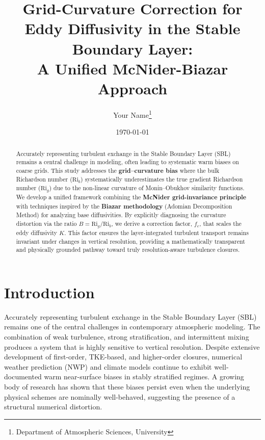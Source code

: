 \documentclass[12pt, a4paper]{article}
\title{Grid-Curvature Correction for Eddy Diffusivity in the Stable Boundary Layer: \\ A Unified McNider-Biazar Approach}
\author{Your Name\thanks{Department of Atmospheric Sciences, University}}
\date{\today}
\begin{document}
\maketitle

\begin{abstract}
Accurately representing turbulent exchange in the Stable Boundary Layer (SBL) remains a central challenge in modeling, often leading to systematic warm biases on coarse grids. This study addresses the \textbf{grid–curvature bias} where the bulk Richardson number ($\text{Ri}_b$) systematically underestimates the true gradient Richardson number ($\text{Ri}_g$) due to the non-linear curvature of Monin–Obukhov similarity functions. We develop a unified framework combining the \textbf{McNider grid-invariance principle} with techniques inspired by the \textbf{Biazar methodology} (Adomian Decomposition Method) for analyzing base diffusivities. By explicitly diagnosing the curvature distortion via the ratio $B=\text{Ri}_g/\text{Ri}_b$, we derive a correction factor, $f_c$, that scales the eddy diffusivity $K$. This factor ensures the layer-integrated turbulent transport remains invariant under changes in vertical resolution, providing a mathematically transparent and physically grounded pathway toward truly resolution-aware turbulence closures.
\end{abstract}

\section{Introduction}

Accurately representing turbulent exchange in the Stable Boundary Layer (SBL) remains one of the central challenges in contemporary atmospheric modeling. The combination of weak turbulence, strong stratification, and intermittent mixing produces a system that is highly sensitive to vertical resolution. Despite extensive development of first-order, TKE-based, and higher-order closures, numerical weather prediction (NWP) and climate models continue to exhibit well-documented warm near-surface biases in stably stratified regimes. A growing body of research has shown that these biases persist even when the underlying physical schemes are nominally well-behaved, suggesting the presence of a structural numerical distortion.
\end{document}
